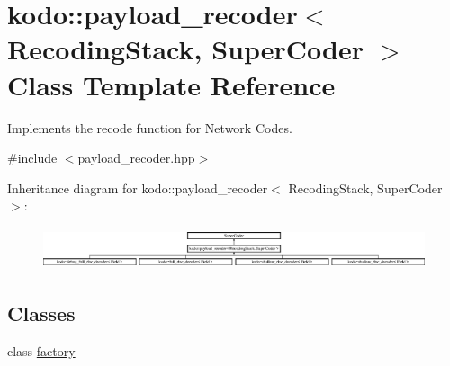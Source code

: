 \hypertarget{classkodo_1_1payload__recoder}{\section{kodo\-:\-:payload\-\_\-recoder$<$ Recoding\-Stack, Super\-Coder $>$ Class Template Reference}
\label{classkodo_1_1payload__recoder}
}


Implements the recode function for Network Codes.  




{\ttfamily \#include $<$payload\-\_\-recoder.\-hpp$>$}

Inheritance diagram for kodo\-:\-:payload\-\_\-recoder$<$ Recoding\-Stack, Super\-Coder $>$\-:\begin{figure}[H]
\begin{center}
\leavevmode
\includegraphics[height=1.250000cm]{classkodo_1_1payload__recoder}
\end{center}
\end{figure}
\subsection*{Classes}
\begin{DoxyCompactItemize}
\item 
class \hyperlink{classkodo_1_1payload__recoder_1_1factory}{factory}
\end{DoxyCompactItemize}
